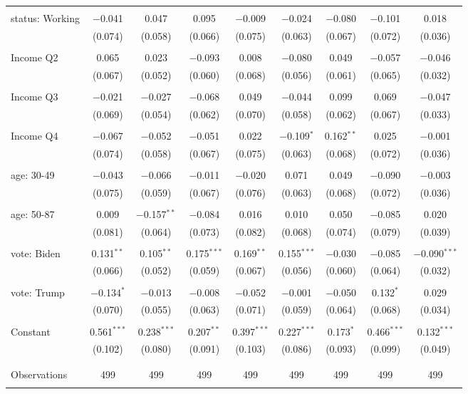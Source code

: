 \begin{tabular}{@{\extracolsep{5pt}}lcccccccc}
  & & & & & & & & \\ 
 status: Working & $-$0.041 & 0.047 & 0.095 & $-$0.009 & $-$0.024 & $-$0.080 & $-$0.101 & 0.018 \\ 
  & (0.074) & (0.058) & (0.066) & (0.075) & (0.063) & (0.067) & (0.072) & (0.036) \\ 
  & & & & & & & & \\ 
 Income Q2 & 0.065 & 0.023 & $-$0.093 & 0.008 & $-$0.080 & 0.049 & $-$0.057 & $-$0.046 \\ 
  & (0.067) & (0.052) & (0.060) & (0.068) & (0.056) & (0.061) & (0.065) & (0.032) \\ 
  & & & & & & & & \\ 
 Income Q3 & $-$0.021 & $-$0.027 & $-$0.068 & 0.049 & $-$0.044 & 0.099 & 0.069 & $-$0.047 \\ 
  & (0.069) & (0.054) & (0.062) & (0.070) & (0.058) & (0.062) & (0.067) & (0.033) \\ 
  & & & & & & & & \\ 
 Income Q4 & $-$0.067 & $-$0.052 & $-$0.051 & 0.022 & $-$0.109$^{*}$ & 0.162$^{**}$ & 0.025 & $-$0.001 \\ 
  & (0.074) & (0.058) & (0.067) & (0.075) & (0.063) & (0.068) & (0.072) & (0.036) \\ 
  & & & & & & & & \\ 
 age: 30-49 & $-$0.043 & $-$0.066 & $-$0.011 & $-$0.020 & 0.071 & 0.049 & $-$0.090 & $-$0.003 \\ 
  & (0.075) & (0.059) & (0.067) & (0.076) & (0.063) & (0.068) & (0.072) & (0.036) \\ 
  & & & & & & & & \\ 
 age: 50-87 & 0.009 & $-$0.157$^{**}$ & $-$0.084 & 0.016 & 0.010 & 0.050 & $-$0.085 & 0.020 \\ 
  & (0.081) & (0.064) & (0.073) & (0.082) & (0.068) & (0.074) & (0.079) & (0.039) \\ 
  & & & & & & & & \\ 
 vote: Biden & 0.131$^{**}$ & 0.105$^{**}$ & 0.175$^{***}$ & 0.169$^{**}$ & 0.155$^{***}$ & $-$0.030 & $-$0.085 & $-$0.090$^{***}$ \\ 
  & (0.066) & (0.052) & (0.059) & (0.067) & (0.056) & (0.060) & (0.064) & (0.032) \\ 
  & & & & & & & & \\ 
 vote: Trump & $-$0.134$^{*}$ & $-$0.013 & $-$0.008 & $-$0.052 & $-$0.001 & $-$0.050 & 0.132$^{*}$ & 0.029 \\ 
  & (0.070) & (0.055) & (0.063) & (0.071) & (0.059) & (0.064) & (0.068) & (0.034) \\ 
  & & & & & & & & \\ 
 Constant & 0.561$^{***}$ & 0.238$^{***}$ & 0.207$^{**}$ & 0.397$^{***}$ & 0.227$^{***}$ & 0.173$^{*}$ & 0.466$^{***}$ & 0.132$^{***}$ \\ 
  & (0.102) & (0.080) & (0.091) & (0.103) & (0.086) & (0.093) & (0.099) & (0.049) \\ 
  & & & & & & & & \\ 
\hline \\[-1.8ex] 

Observations & 499 & 499 & 499 & 499 & 499 & 499 & 499 & 499 \\ 
\hline 
\hline \\[-1.8ex] 
\end{tabular} 